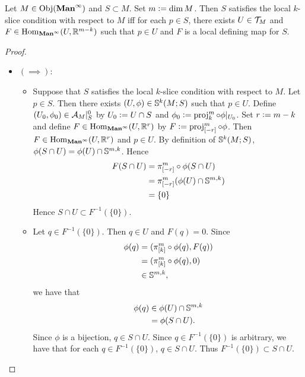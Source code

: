 \documentclass{book}
\begin{document}
	\begin{ex} 
		Let $M \in \Obj(\bManinf)$ and $S \subset M$. Set $m \defeq \dim M$. Then $S$ satisfies the local $k$-slice condition with respect to $M$ iff for each $p \in S$, there exists $U \in \MT_M$ and $F \in \Hom_{\bManinf}(U, \R^{m-k})$ such that $p \in U$ and $F$ is a local defining map for $S$.
	\end{ex}

	\begin{proof}\
		\begin{itemize}
			\item $(\implies):$ \\
			\begin{itemize}
				\item Suppose that $S$ satisfies the local $k$-slice condition with respect to $M$. Let $p \in S$. Then there exists $(U, \phi) \in \S^k(M; S)$ such that $p \in U$. Define $(U_0, \phi_0) \in \MA_M|_S^0$ by $U_0 \defeq U \cap S$ and $\phi_0 \defeq \prj^m_{k} \circ \phi|_{U_0}$. Set $r \defeq m - k$ and define $F \in \Hom_{\bManinf}(U, \R^r)$ by $F \defeq \prj^m_{[-r]} \circ \phi$. Then $F \in \Hom_{\bManinf}(U, \R^r)$ and $p \in U$. By definition of $\S^k(M; S)$, $\phi(S \cap U) = \phi(U) \cap \S^{m,k}$. Hence 
				\begin{align*}
					F(S \cap U)
					& = \pi^m_{[-r]} \circ \phi(S \cap U) \\
					& = \pi^m_{[-r]} (\phi(U) \cap \S^{m,k}) \\
					& = \{0\} 
				\end{align*}
				Hence $S \cap U \subset F^{-1}(\{0\})$. 
				\item Let $q \in F^{-1}(\{0\})$. Then $q \in U$ and $F(q) = 0$. Since 
				\begin{align*}
					\phi(q)
					& = (\pi^m_{[k]} \circ \phi(q), F(q)) \\
					& = (\pi^m_{[k]} \circ \phi(q), 0) \\
					& \in \S^{m,k},
				\end{align*}
				we have that 
				\begin{align*}
					\phi(q) 
					& \in \phi(U) \cap \S^{m,k} \\
					& = \phi(S \cap U).
				\end{align*}
				Since $\phi$ is a bijection, $q \in S \cap U$. Since $q \in F^{-1}(\{0\})$ is arbitrary, we have that for each $q \in F^{-1}(\{0\})$, $q \in S \cap U$. Thus $F^{-1}(\{0\}) \subset S \cap U$.  
			\end{itemize}

\end{itemize}
\end{proof}
\end{document}
